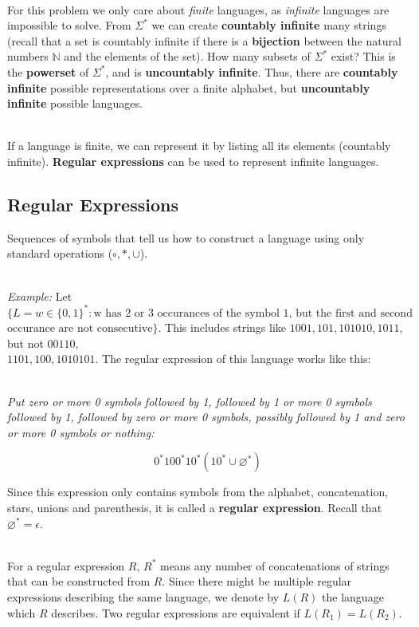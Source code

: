 \documentclass[12pt]{article}
\begin{document}
\noindent
\\
For this problem we only care about \textit{finite} languages, as \textit{infinite} languages are impossible to solve.
From $\Sigma^*$ we can create \textbf{countably infinite} many strings (recall that a set is countably infinite if there is a \textbf{bijection} between the natural numbers $\mathbb{N}$ and the elements of the set).
How many subsets of $\Sigma^*$ exist?
This is the \textbf{powerset} of $\Sigma^*$, and is \textbf{uncountably infinite}.
Thus, there are \textbf{countably infinite} possible representations over a finite alphabet, but \textbf{uncountably infinite} possible languages.

\noindent
\\
If a language is finite, we can represent it by listing all its elements (countably infinite).
\textbf{Regular expressions} can be used to represent infinite languages.

\subsection*{Regular Expressions}
Sequences of symbols that tell us how to construct a language using only standard operations ($\circ, *, \cup$).

\noindent
\\
\textit{Example:} Let $\{ L = w \in \{ 0, 1 \}^* : \text{w has 2 or 3 occurances of the symbol 1, but the first and second }$\\$\text{occurance are not consecutive} \}$.
This includes strings like $1001, 101, 101010, 1011$, but not $00110, $\\$1101, 100, 1010101$.
The regular expression of this language works like this:

\noindent
\\
\textit{Put zero or more 0 symbols followed by 1, followed by 1 or more 0 symbols followed by 1, followed by zero or more 0 symbols, possibly followed by 1 and zero or more 0 symbols or nothing:}

\[ 0^*100^*10^*(10^* \cup \varnothing^*) \]

\noindent
Since this expression only contains symbols from the alphabet, concatenation, stars, unions and parenthesis, it is called a \textbf{regular expression}.
Recall that $\varnothing^* = \epsilon$.

\noindent
\\
For a regular expression $R$, $R^*$ means any number of concatenations of strings that can be constructed from $R$.
Since there might be multiple regular expressions describing the same language, we denote by $L(R)$ the language which $R$ describes.
Two regular expressions are equivalent if $L(R_1) = L(R_2)$.
\end{document}

